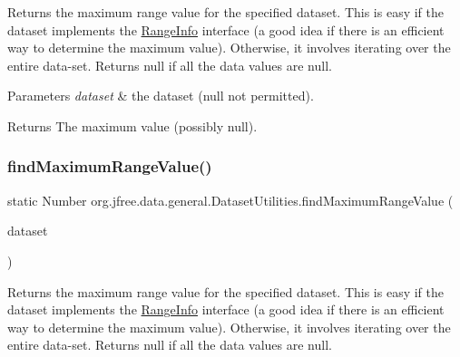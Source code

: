 Returns the maximum range value for the specified dataset. This is easy if the dataset implements the \mbox{\hyperlink{interfaceorg_1_1jfree_1_1data_1_1_range_info}{Range\+Info}} interface (a good idea if there is an efficient way to determine the maximum value). Otherwise, it involves iterating over the entire data-\/set. Returns {\ttfamily null} if all the data values are {\ttfamily null}.


\begin{DoxyParams}{Parameters}
{\em dataset} & the dataset ({\ttfamily null} not permitted).\\
\hline
\end{DoxyParams}
\begin{DoxyReturn}{Returns}
The maximum value (possibly {\ttfamily null}). 
\end{DoxyReturn}
\mbox{\label{classorg_1_1jfree_1_1data_1_1general_1_1_dataset_utilities_a3c6815c5284c6a0323ccfd6b9aa40cab}} 
\subsubsection{\texorpdfstring{find\+Maximum\+Range\+Value()}{findMaximumRangeValue()}\hspace{0.1cm}{\footnotesize\ttfamily [2/2]}}
{\footnotesize\ttfamily static Number org.\+jfree.\+data.\+general.\+Dataset\+Utilities.\+find\+Maximum\+Range\+Value (\begin{DoxyParamCaption}\item[{\mbox{\hyperlink{interfaceorg_1_1jfree_1_1data_1_1xy_1_1_x_y_dataset}{X\+Y\+Dataset}}}]{dataset }\end{DoxyParamCaption})\hspace{0.3cm}{\ttfamily [static]}}

Returns the maximum range value for the specified dataset. This is easy if the dataset implements the \mbox{\hyperlink{interfaceorg_1_1jfree_1_1data_1_1_range_info}{Range\+Info}} interface (a good idea if there is an efficient way to determine the maximum value). Otherwise, it involves iterating over the entire data-\/set. Returns {\ttfamily null} if all the data values are {\ttfamily null}.


